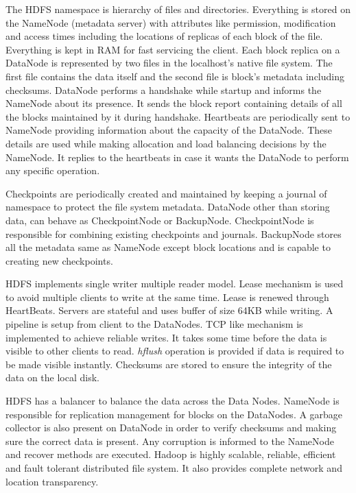 \documentclass[a4paper,12pt]{article}
\begin{document}
The HDFS namespace is hierarchy of files and directories. Everything is stored on the NameNode (metadata server) with attributes like permission, modification and access times including the locations of replicas of each block of the file. Everything is kept in RAM for fast servicing the client. Each block replica on a DataNode is represented by two files in the localhost's native file system. The first file contains the data itself and the second file is block's metadata including checksums. DataNode performs a handshake while startup and informs the NameNode about its presence. It sends the block report containing details of all the blocks maintained by it during handshake. Heartbeats are periodically sent to NameNode providing information about the capacity of the DataNode. These details are used while making allocation and load balancing decisions by the NameNode. It replies to the heartbeats in case it wants the DataNode to perform any specific operation.

Checkpoints are periodically created and maintained by keeping a journal of namespace to protect the file system metadata. DataNode other than storing data, can behave as CheckpointNode or BackupNode. CheckpointNode is responsible for combining existing checkpoints and journals. BackupNode stores all the metadata same as NameNode except block locations and is capable to creating new checkpoints.

HDFS implements single writer multiple reader model. Lease mechanism is used to avoid multiple clients to write at the same time. Lease is renewed through HeartBeats. Servers are stateful and uses buffer of size 64KB while writing. A pipeline is setup from client to the DataNodes. TCP like mechanism is implemented to achieve reliable writes. It takes some time before the data is visible to other clients to read. \textit{hflush} operation is provided if data is required to be made visible instantly. Checksums are stored to ensure the integrity of the data on the local disk.

HDFS has a balancer to balance the data across the Data Nodes. NameNode is responsible for replication management for blocks on the DataNodes. A garbage collector is also present on DataNode in order to verify checksums and making sure the correct data is present. Any corruption is informed to the NameNode and recover methods are executed. Hadoop is highly scalable, reliable, efficient and fault tolerant distributed file system. It also provides complete network and location transparency.
\end{document}

